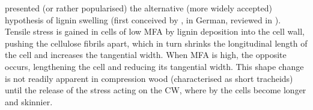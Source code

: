 \cite{Boyd_1972} presented (or rather popularised) the alternative (more widely
accepted) hypothesis of lignin swelling (first conceived by \cite{munch1938}, in German, reviewed in \cite{Boyd_1972}). Tensile
stress is gained in cells of low MFA by lignin deposition into the cell wall,
pushing the cellulose fibrils apart, which in turn shrinks the longitudinal
length of the cell and increases the tangential width. When MFA is high, the
opposite occurs, lengthening the cell and reducing its tangential width. This
shape change is not readily apparent in compression wood (characterised as short
tracheids) until the release of the stress acting on the CW, where by the cells
become longer and skinnier.
